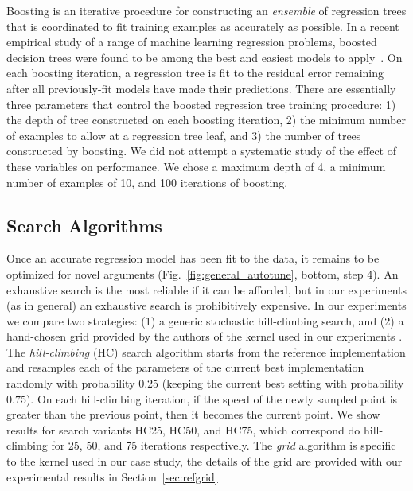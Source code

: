 \documentclass{sig-alternate}
\begin{document}
Boosting is an iterative procedure for constructing an {\em ensemble} of regression trees that is coordinated to fit training examples as accurately as possible.
\citep{schapire:2001,friedman:2002}
In a recent empirical study of a range of machine learning regression problems,
boosted decision trees were found to be among the best and easiest models to
apply~\citep{caruana+niculescu-mizil:2006}.
On each boosting iteration, a regression tree is fit to the residual error remaining
after all previously-fit models have made their predictions.
There are essentially three parameters that control the boosted regression tree
training procedure:
1) the depth of tree constructed on each boosting iteration,
2) the minimum number of examples to allow at a regression tree leaf, and
3) the number of trees constructed by boosting.
We did not attempt a systematic study of the effect of these variables on performance.
We chose a maximum depth of 4,
a minimum number of examples of 10,
and 100 iterations of boosting.

\subsection{Search Algorithms}

Once an accurate regression model has been fit to the data, it remains to be optimized for novel arguments (Fig.~\ref{fig:general_autotune}, bottom, step 4).
An exhaustive search is the most reliable if it can be afforded, but in our experiments
(as in general) an exhaustive search is prohibitively expensive.
In our experiments we compare two strategies:
(1)
a generic stochastic hill-climbing search,
and (2)
a hand-chosen grid provided by the authors of the kernel used in our experiments \citep{pinto+cox:2011gcg}.
The {\em hill-climbing} (HC) search algorithm starts from the reference
implementation and resamples each of the parameters
of the current best implementation randomly with
probability $0.25$ (keeping the current best setting with probability $0.75$).
On each hill-climbing iteration, if the speed of the newly sampled point is greater than the previous point, then it becomes the current point.
We show results for search variants HC25, HC50, and HC75, which correspond do hill-climbing for 25, 50, and 75 iterations respectively.
The {\em grid} algorithm is specific to the kernel used in our case study,
the details of the grid are provided with our experimental results in Section~\ref{sec:refgrid}

\end{document}
